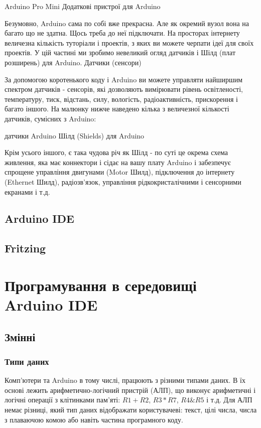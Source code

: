 \documentclass[12pt,a4paper]{report}  %
\begin{document}
Arduino Pro Mini
Додаткові пристрої для Arduino

Безумовно, Arduino сама по собі вже прекрасна. Але як окремий вузол вона на багато що не здатна. Щось треба до неї підключати. На просторах інтернету величезна кількість туторіали і проектів, з яких ви можете черпати ідеї для своїх проектів. У цій частині ми зробимо невеликий огляд датчиків і Шілд (плат розширень) для Arduino.
Датчики (сенсори)

За допомогою коротенького коду і Arduino ви можете управляти найширшим спектром датчиків - сенсорів, які дозволяють вимірювати рівень освітленості, температуру, тиск, відстань, силу, вологість, радіоактивність, прискорення і багато іншого. На малюнку нижче наведено кілька з величезної кількості датчиків, сумісних з Arduino:

датчики Arduino
Шілд (Shields) для Arduino

Крім усього іншого, є така чудова річ як Шілд - по суті це окрема схема живлення, яка має коннектори і сідає на вашу плату Arduino і забезпечує спрощене управління двигунами (Motor Шилд), підключення до інтернету (Ethernet Шилд), радіозв'язок, управління рідкокристалічними і сенсорними екранами і т.д.

\section{Arduino IDE}

\section{Fritzing}

\chapter{Програмування в середовищі\\Arduino IDE}

\section{Змінні}

\subsection{Типи даних}

Комп'ютери та Arduino в тому числі, працюють з різними типами даних. В їх основі лежить арифметично-логічний пристрій (АЛП), що виконує арифметичні і логічні операції з клітинками пам'яті: $R1 + R2$, $R3 * R7$, $R4 \& R5$ і т.д. Для АЛП немає різниці, який тип даних відображати користувачеві: текст, цілі числа, числа з плаваючою комою або навіть частина програмного коду.
\end{document}
